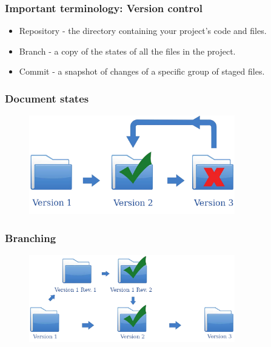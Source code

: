 \begin{frame}[t]
    \frametitle{Important terminology: Version control}
    
    \begin{itemize}
        \item Repository - the directory containing your project's code and files.
        \item Branch - a copy of the states of all the files in the project.
        \item Commit - a snapshot of changes of a specific group of staged files.
    \end{itemize}
\end{frame}

\begin{frame}
  \frametitle{Document states}
  \begin{figure}[htpb]
      \centering
      \includegraphics[width=0.8\textwidth]{images/singleton-vc.png}
  \end{figure}
\end{frame}

\begin{frame}
    \frametitle{Branching}
    \begin{figure}[htpb]
        \centering
        \includegraphics[width=0.8\textwidth]{images/branching-vc.png}
    \end{figure} 
\end{frame}

